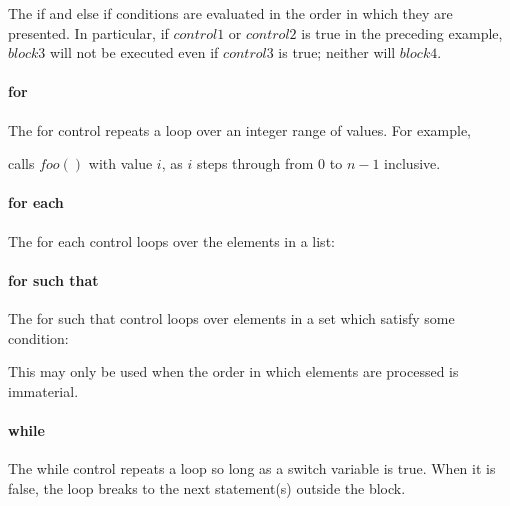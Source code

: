 The if and else if conditions are evaluated in the order in which they
are presented. In particular, if $control1$ or $control2$ is true in
the preceding example, $block3$ will not be executed
even if $control3$ is true; neither will $block4$.

\paragraph*{for}

The for control repeats a loop over an integer range of values. For example,

\begin{pseudo*}
\bsEND
\end{pseudo*}

calls $foo()$ with value $i$, as $i$ steps through from 0 to $n-1$ inclusive.


\paragraph*{for each} The for each control loops over the elements in
a list:

\begin{pseudo*}
\bsEND
\end{pseudo*}

\paragraph*{for such that} The for such that control loops over elements in
a set which satisfy some condition:

\begin{pseudo*}
\bsEND
\end{pseudo*}

This may only be used when the order in which elements are processed is 
immaterial.

\paragraph*{while}

The while control repeats a loop so long as a switch variable is true. 
When it is false, the loop breaks to the next statement(s) outside the block.

\begin{pseudo*}
\bsEND
{}
\end{pseudo*}

